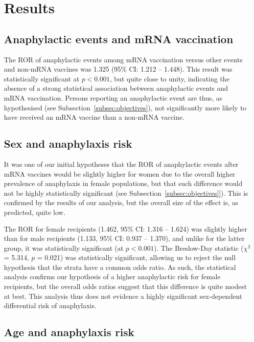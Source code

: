 \documentclass{article}
\begin{document}
\section{Results}

\subsection{Anaphylactic events and mRNA vaccination}

The ROR of anaphylactic events among mRNA vaccination versus other events and non-mRNA vaccines was 1.325 (95\% CI: 1.212 -- 1.448).
This result was statistically significant at $p < 0.001$, but quite close to unity, indicating the absence of a strong statistical association between anaphylactic events and mRNA vaccination.
Persons reporting an anaphylactic event are thus, as hypothesised (see Subsection~\ref{subsec:objectives}), not significantly more likely to have received an mRNA vaccine than a non-mRNA vaccine.

\subsection{Sex and anaphylaxis risk}

It was one of our initial hypotheses that the ROR of anaphylactic events after mRNA vaccines would be slightly higher for women due to the overall higher prevalence of anaphylaxis in female populations, but that such difference would not be highly statistically significant (see Subsection~\ref{subsec:objectives}]).
This is confirmed by the results of our analysis, but the overall size of the effect is, as predicted, quite low.

The ROR for female recipients (1.462, 95\% CI: 1.316 -- 1.624) was slightly higher than for male recipients (1.133, 95\% CI: 0.937 -- 1.370), and unlike for the latter group, it was statistically significant (at $p < 0.001$).
The Breslow-Day statistic ($\chi^2$ = 5.314, $p$ = 0.021) was statistically significant, allowing us to reject the null hypothesis that the strata have a common odds ratio.
As such, the statistical analysis confirms our hypothesis of a higher anaphylactic risk for female recipients, but the overall odds ratios suggest that this difference is quite modest at best.
This analysis thus does not evidence a highly significant sex-dependent differential risk of anaphylaxis.

\subsection{Age and anaphylaxis risk}
\end{document}
